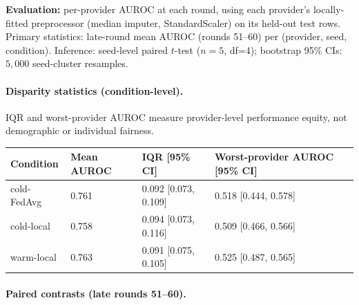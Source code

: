\noindent\textbf{Evaluation:} per-provider AUROC at each round,
using each provider's locally-fitted preprocessor (median imputer,
StandardScaler) on its held-out test rows.
Primary statistics: late-round mean AUROC (rounds 51--60) per
(provider, seed, condition). Inference: seed-level paired $t$-test
($n=5$, df=4); bootstrap 95\% CIs: $5{,}000$ seed-cluster resamples.

\paragraph{Disparity statistics (condition-level).}
IQR and worst-provider AUROC measure provider-level performance equity,
not demographic or individual fairness.

\begin{tabular}{@{}lllll@{}}
\hline
Condition & Mean AUROC & IQR [95\% CI] & Worst-provider AUROC [95\% CI] \\
\hline
cold-FedAvg & 0.761 & 0.092 [0.073, 0.109] & 0.518 [0.444, 0.578] \\
cold-local  & 0.758 & 0.094 [0.073, 0.116] & 0.509 [0.466, 0.566] \\
warm-local  & 0.763 & 0.091 [0.075, 0.105] & 0.525 [0.487, 0.565] \\
\hline
\end{tabular}

\paragraph{Paired contrasts (late rounds 51--60).}

